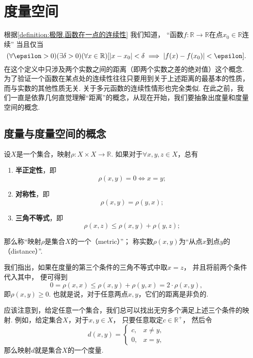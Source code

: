 \section{度量空间}
根据\cref{definition:极限.函数在一点的连续性} 我们知道，
“函数\(f\colon\mathbb{R}\to\mathbb{R}\)在点\(x_0\in\mathbb{R}\)连续”
当且仅当\[
	(\forall\epsilon>0)
	(\exists\delta>0)
	(\forall x\in\mathbb{R})
	[
		\abs{x - x_0}<\delta
		\implies
		\abs{f(x) - f(x_0)} < \epsilon
	].
\]
在这个定义中只涉及两个实数之间的距离（即两个实数之差的绝对值）这个概念.
为了验证一个函数在某点处的连续性往往只要用到关于上述距离的最基本的性质，而与实数的其他性质无关.
关于多元函数的连续性情形也完全类似.
在此之前，我们一直是依靠几何直觉理解“距离”的概念，从现在开始，我们要抽象出度量和度量空间的概念.

\subsection{度量与度量空间的概念}
\begin{definition}
设\(X\)是一个集合，映射\(\rho\colon X \times X\to\mathbb{R}\).
如果对于\(\forall x,y,z \in X\)，总有\begin{enumerate}
	\item {\bf 半正定性}，即\[
		\rho(x,y)=0 \iff x=y;
	\]

	\item {\bf 对称性}，即\[
		\rho(x,y) = \rho(y,x);
	\]

	\item {\bf 三角不等式}，即\[
		\rho(x,z) \leq \rho(x,y) + \rho(y,z);
	\]
\end{enumerate}
那么称“映射\(\rho\)是集合\(X\)的一个（metric）”；
称实数\(\rho(x,y)\)为“从点\(x\)到点\(y\)的（distance）”.
\end{definition}

我们指出，如果在度量的第三个条件的三角不等式中取\(x=z\)，
并且将前两个条件代入其中，
便可得到\[
	0=\rho(x,x)\leq\rho(x,y)+\rho(y,x)=2\cdot\rho(x,y),
\]
即\(\rho(x,y)\geq0\).
也就是说，对于任意两点\(x,y\)，它们的距离是非负的.

应该注意到，给定任意一个集合，我们总可以找出无穷多个满足上述三个条件的映射.
例如，给定集合\(X\)，对于\(x,y \in X\)，
只要任意取定\(c\in\mathbb{R}^+\)，
然后令\[
	d(x,y) = \left\{ \begin{array}{cl}
		c, & x \neq y, \\
		0, & x=y,
	\end{array} \right.
\]
那么映射\(d\)就是集合\(X\)的一个度量.

